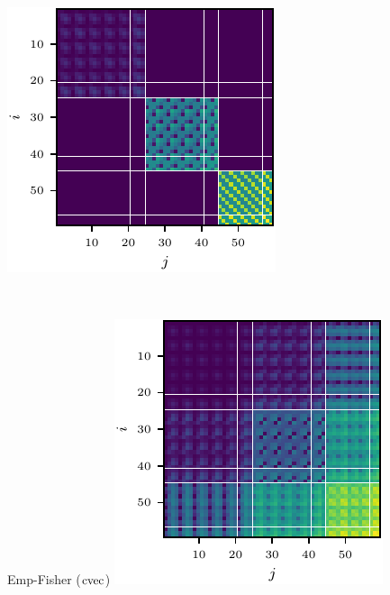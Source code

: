 \begin{figure}[t!]
\begin{minipage}[t]{0.485\linewidth}
    \includegraphics[width=0.8\linewidth]{../kfs/plots/synthetic_cvec_mcfisher_100_kfac.pdf}
  \end{minipage}
  \\
  \begin{minipage}[t]{0.485\linewidth}
    \centering
    Emp-Fisher ($\operatorname{cvec}$)\vspace{1ex}
    \includegraphics[width=0.8\linewidth]{../kfs/plots/synthetic_cvec_empfisher_full.pdf}

\end{minipage}
\end{figure}
